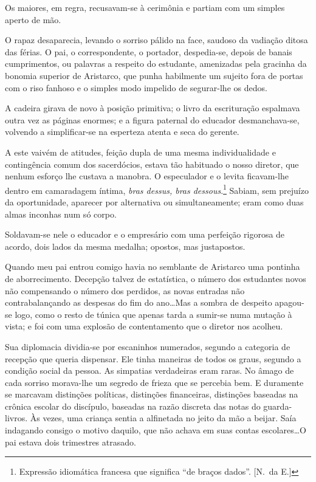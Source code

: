 Os maiores, em regra, recusavam{}-se à cerimônia e partiam com
um simples aperto de mão. 

O rapaz desaparecia, levando o sorriso pálido
na face, saudoso da vadiação ditosa das férias. O pai, o
correspondente, o portador, despedia{}-se, depois de banais
cumprimentos, ou palavras a respeito do estudante, amenizadas pela
gracinha da bonomia superior de Aristarco, que punha habilmente um
sujeito fora de portas com o riso fanhoso e o simples modo impelido de
segurar{}-lhe os dedos. 


A cadeira girava de novo à posição primitiva; o
livro da escrituração espalmava outra vez as páginas enormes; e a
figura paternal do educador desmanchava{}-se, volvendo a
simplificar{}-se na esperteza atenta e seca do gerente. 

A este vaivém de atitudes, feição dupla de uma mesma individualidade e contingência
comum dos sacerdócios, estava tão habituado o nosso diretor, que nenhum
esforço lhe custava a manobra. O especulador e o levita ficavam{}-lhe
dentro em camaradagem íntima, \textit{bras dessus, bras dessous}.\footnote{ Expressão idiomática 
francesa que significa ``de braços dados''. [N.~da E.]}
Sabiam, sem prejuízo da oportunidade, aparecer por alternativa ou simultaneamente;
eram como duas almas inconhas num só corpo. 

Soldavam{}-se nele o educador e o empresário com uma perfeição rigorosa de acordo, 
dois lados da mesma medalha; opostos, mas justapostos. 

Quando meu pai entrou
comigo havia no semblante de Aristarco uma pontinha de aborrecimento.
Decepção talvez de estatística, o número dos estudantes novos não
compensando o número dos perdidos, as novas entradas não
contrabalançando as despesas do fim do ano\ldots Mas a sombra de despeito
apagou{}-se logo, como o resto de túnica que apenas tarda a sumir{}-se
numa mutação à vista; e foi com uma explosão de contentamento que o
diretor nos acolheu. 

Sua diplomacia dividia{}-se por escaninhos
numerados, segundo a categoria de recepção que queria dispensar. Ele
tinha maneiras de todos os graus, segundo a condição social da pessoa.
As simpatias verdadeiras eram raras. No âmago de cada sorriso
morava{}-lhe um segredo de frieza que se percebia bem. E duramente se
marcavam distinções políticas, distinções financeiras, distinções
baseadas na crônica escolar do discípulo, baseadas na razão discreta
das notas do guarda{}-livros. Às vezes, uma criança sentia a alfinetada
no jeito da mão a beijar. Saía indagando consigo o motivo daquilo, que
não achava em suas contas escolares\ldots O pai estava dois trimestres
atrasado. 

